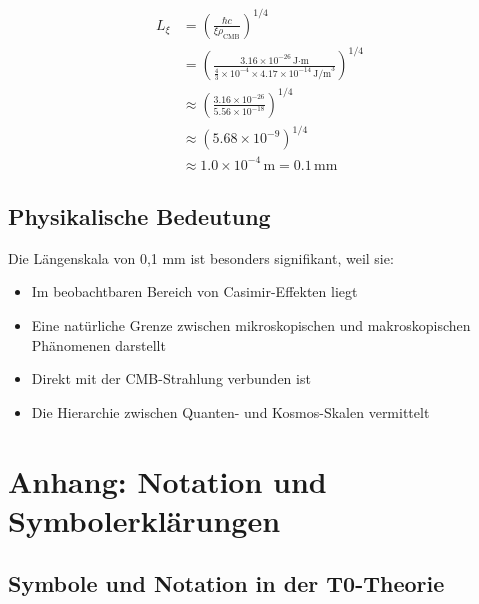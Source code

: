 \documentclass[12pt,a4paper]{article}
\numberwithin{equation}{section}
\begin{document}
	\begin{align*}
		L_\xi &= \left(\frac{\hbar c}{\xi \rho_{\text{CMB}}}\right)^{1/4} \\
		&= \left(\frac{3.16 \times 10^{-26}\,\text{J·m}}{\frac{4}{3} \times 10^{-4} \times 4.17 \times 10^{-14}\,\text{J/m}^3}\right)^{1/4} \\
		&\approx \left(\frac{3.16 \times 10^{-26}}{5.56 \times 10^{-18}}\right)^{1/4} \\
		&\approx \left(5.68 \times 10^{-9}\right)^{1/4} \\
		&\approx 1.0 \times 10^{-4}\,\text{m} = 0.1\,\text{mm}
	\end{align*}
	
	\subsection*{Physikalische Bedeutung}
	
	Die Längenskala von 0,1 mm ist besonders signifikant, weil sie:
	\begin{itemize}
		\item Im beobachtbaren Bereich von Casimir-Effekten liegt
		\item Eine natürliche Grenze zwischen mikroskopischen und makroskopischen Phänomenen darstellt
		\item Direkt mit der CMB-Strahlung verbunden ist
		\item Die Hierarchie zwischen Quanten- und Kosmos-Skalen vermittelt
	\end{itemize}
	
	\section*{Anhang: Notation und Symbolerklärungen}
	
	\subsection*{Symbole und Notation in der T0-Theorie}
	
\end{document}
